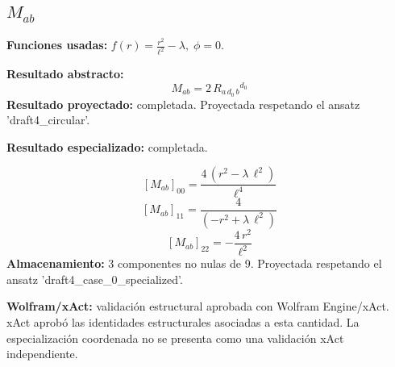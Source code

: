 \documentclass[11pt]{article}
\begin{document}
\subsection*{$ M_{ab} $}
\textbf{Funciones usadas:} $ f\!\left(r\right) = \frac{{r}^{2}}{{\ell}^{2}} - \lambda,\;\phi=0 $.\par
\textbf{Resultado abstracto:}
\begin{dmath*}[breakdepth={5}]
M_{ab} = 2\,R{}_{a\,d_{0}\,b}{}^{d_{0}}
\end{dmath*}
\textbf{Resultado proyectado:} completada. Proyectada respetando el ansatz 'draft4\_circular'.\par
\textbf{Resultado especializado:} completada.\par
\begin{dmath*}[breakdepth={5}]
\left[M_{ab}\right]_{00} = \frac{4\,\left({r}^{2} - \lambda\,{\ell}^{2}\right)}{{\ell}^{4}}
\end{dmath*}
\begin{dmath*}[breakdepth={5}]
\left[M_{ab}\right]_{11} = \frac{4}{\left(-{r}^{2} + \lambda\,{\ell}^{2}\right)}
\end{dmath*}
\begin{dmath*}[breakdepth={5}]
\left[M_{ab}\right]_{22} = -\frac{4\,{r}^{2}}{{\ell}^{2}}
\end{dmath*}
\textbf{Almacenamiento:} 3 componentes no nulas de 9. Proyectada respetando el ansatz 'draft4\_case\_0\_specialized'.\par
\textbf{Wolfram/xAct:} validación estructural aprobada con Wolfram Engine/xAct. xAct aprobó las identidades estructurales asociadas a esta cantidad. La especialización coordenada no se presenta como una validación xAct independiente.\par\medskip
{}
\end{document}
